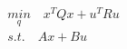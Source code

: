 \documentclass[preview]{standalone}
\begin{document}
\begin{align*}
\underset{q}{min} \quad x^TQx + u^T R u \\ s.t. \quad Ax + Bu
\end{align*}
\end{document}
